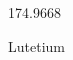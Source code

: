 \documentclass[12pt]{article}
\begin{document}
\hfill{}
\vfill
\begin{center}
  {\fontsize{50}{60}
  }

  \vspace{1em}

  174.9668

Lutetium
\end{center}
\vfill
\end{document}
